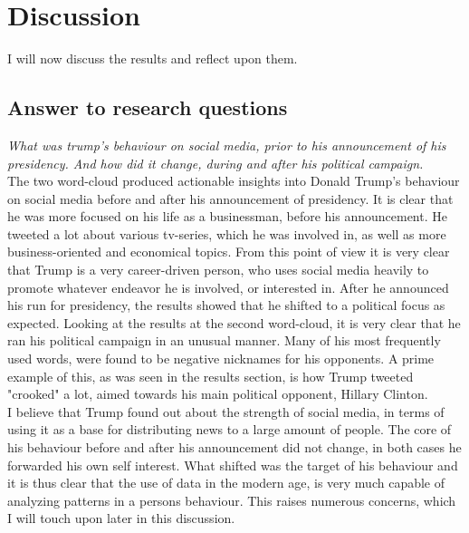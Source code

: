 \documentclass[12pt]{article}
\begin{document}


\section{Discussion}
I will now discuss the results and reflect upon them. 

\subsection{Answer to research questions}

\textit{What was trump's behaviour on social media, prior to his announcement of his presidency. And how did it change, during and after his political campaign.}\\
The two word-cloud produced actionable insights into Donald Trump's behaviour on social media before and after his announcement of presidency. It is clear that he was more focused on his life as a businessman, before his announcement. He tweeted a lot about  various tv-series, which he was involved in, as well as more business-oriented and economical topics. From this point of view it is very clear that Trump is a very career-driven person, who uses social media heavily to promote whatever endeavor he is involved, or interested in. After he announced his run for presidency, the results showed that he shifted to a political focus as expected. Looking at the results at the second word-cloud, it is very clear that he ran his political campaign in an unusual manner. Many of his most frequently used words, were found to be negative nicknames for his opponents. A prime example of this, as was seen in the results section, is how Trump tweeted "crooked" a lot, aimed towards his main political opponent, Hillary Clinton. \\ 

I believe that Trump found out about the strength of social media, in terms of using it as a base for distributing news to a large amount of people. The core of his behaviour before and after his announcement did not change, in both cases he forwarded his own self interest. What shifted was the target of his behaviour and it is thus clear that the use of data in the modern age, is very much capable of analyzing patterns in a persons behaviour. This raises numerous concerns, which I will touch upon later in this discussion. \\
\end{document}

